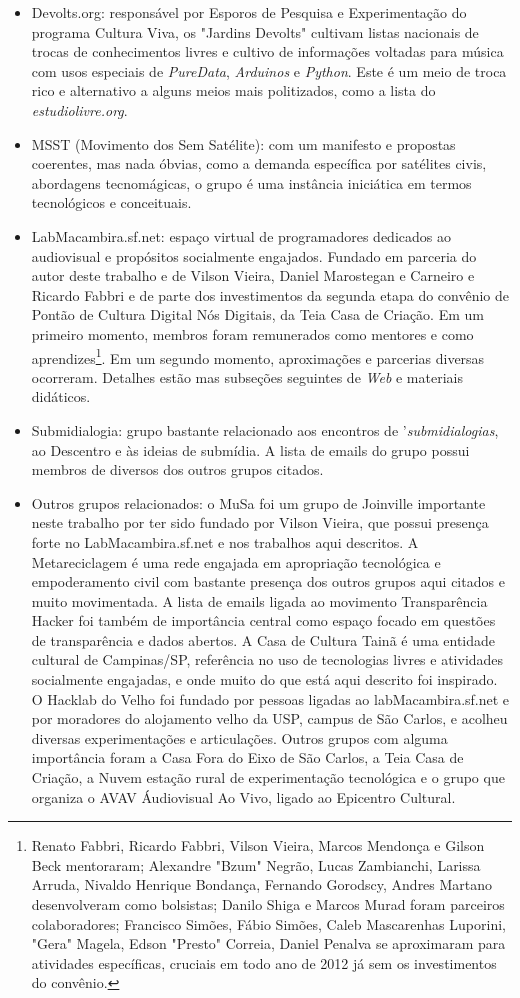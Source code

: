 \begin{itemize}
    \item Devolts.org: responsável por Esporos de Pesquisa e Experimentação do programa Cultura Viva, os "Jardins Devolts" cultivam listas nacionais de trocas de conhecimentos livres e cultivo de informações voltadas para música com usos especiais de \emph{PureData}, \emph{Arduinos} e \emph{Python}. Este é um meio de troca rico e alternativo a alguns meios mais politizados, como a lista do \emph{estudiolivre.org}.
    \item MSST (Movimento dos Sem Satélite): com um manifesto e propostas coerentes, mas nada óbvias, como a demanda específica por satélites civis, abordagens tecnomágicas, o grupo é uma instância iniciática em termos tecnológicos e conceituais.
    \item LabMacambira.sf.net: espaço virtual de programadores dedicados ao audiovisual e propósitos socialmente engajados. Fundado em parceria do autor deste trabalho e de Vilson Vieira, Daniel Marostegan e Carneiro e Ricardo Fabbri e de parte dos investimentos da segunda etapa do convênio de Pontão de Cultura Digital Nós Digitais, da Teia Casa de Criação. Em um primeiro momento, membros foram remunerados como mentores e como aprendizes\footnote{Renato Fabbri, Ricardo Fabbri, Vilson Vieira, Marcos Mendonça e Gilson Beck mentoraram; Alexandre "Bzum" Negrão, Lucas Zambianchi, Larissa Arruda, Nivaldo Henrique Bondança, Fernando Gorodscy, Andres Martano desenvolveram como bolsistas; Danilo Shiga e Marcos Murad foram parceiros colaboradores; Francisco Simões, Fábio Simões, Caleb Mascarenhas Luporini, "Gera" Magela, Edson "Presto" Correia, Daniel Penalva se aproximaram para atividades específicas, cruciais em todo ano de 2012 já sem os investimentos do convênio.}. Em um segundo momento, aproximações e parcerias diversas ocorreram. Detalhes estão mas subseções seguintes de \emph{Web} e materiais didáticos.
    \item Submidialogia: grupo bastante relacionado aos encontros de '\emph{submidialogias}, ao Descentro e às ideias de submídia. A lista de emails do grupo possui membros de diversos dos outros grupos citados.
    \item Outros grupos relacionados: o MuSa foi um grupo de Joinville importante neste trabalho por ter sido fundado por Vilson Vieira, que possui presença forte no LabMacambira.sf.net e nos trabalhos aqui descritos. A Metareciclagem é uma rede engajada em apropriação tecnológica e empoderamento civil com bastante presença dos outros grupos aqui citados e muito movimentada. A lista de emails ligada ao movimento Transparência Hacker foi também de importância central como espaço focado em questões de transparência e dados abertos. A Casa de Cultura Tainã é uma entidade cultural de Campinas/SP, referência no uso de tecnologias livres e atividades socialmente engajadas, e onde muito do que está aqui descrito foi inspirado. O Hacklab do Velho foi fundado por pessoas ligadas ao labMacambira.sf.net e por moradores do alojamento velho da USP, campus de São Carlos, e acolheu diversas experimentações e articulações. Outros grupos com alguma importância foram a Casa Fora do Eixo de São Carlos, a Teia Casa de Criação, a Nuvem estação rural de experimentação tecnológica e o grupo que organiza o AVAV Áudiovisual Ao Vivo, ligado ao Epicentro Cultural.

\end{itemize}
